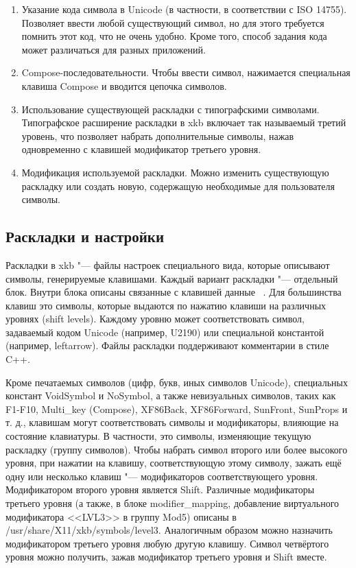 \documentclass[10pt, a5paper]{article}
\begin{document}
\begin{enumerate}
  \item Указание кода символа в Unicode (в частности, в соответствии с ISO 14755).
Позволяет ввести любой существующий символ, но для этого требуется помнить этот код, что не очень удобно. Кроме того, способ задания кода может различаться для разных приложений.
  \item Compose-последовательности.
Чтобы ввести символ, нажимается специальная клавиша Compose и вводится цепочка символов.
  \item Использование существующей раскладки с типографскими \linebreak символами.
Типографское расширение раскладки в xkb включает так называемый третий уровень, что позволяет набрать дополнительные символы, нажав одновременно с клавишей модификатор третьего уровня.
  \item Модификация используемой раскладки.
Можно изменить существующую раскладку или создать новую, содержащую необходимые для пользователя символы.
\end{enumerate}

\subsection*{Раскладки и настройки}

Раскладки в xkb "--- файлы настроек специального вида, которые описывают символы, генерируемые клавишами. Каждый вариант раскладки "--- отдельный блок. Внутри блока описаны связанные с клавишей данные ~\cite{Kononova1}. Для большинства клавиш это символы, которые выдаются по нажатию клавиши на различных уровнях (shift levels). 
Каждому уровню может соответствовать символ, задаваемый кодом Unicode (например, U2190) или специальной константой (например, leftarrow). Файлы раскладки поддерживают комментарии в стиле C++.

Кроме печатаемых символов (цифр, букв, иных символов \linebreak Unicode), специальных констант VoidSymbol и NoSymbol, а также невизуальных символов, таких как F1-F10, Multi\_key \linebreak (Compose), XF86Back, XF86Forward, SunFront, SunProps и т. д., клавишам могут соответствовать символы и модификаторы, влияющие на состояние клавиатуры. В частности, это символы, изменяющие текущую раскладку (группу символов). 
Чтобы набрать символ второго или более высокого уровня, при нажатии на клавишу, соответствующую этому символу, зажать ещё одну или несколько клавиш "--- модификаторов  соответствующего уровня. Модификатором второго уровня является Shift. Различные модификаторы третьего уровня (а также, в блоке modifier\_mapping, добавление виртуального модификатора <<LVL3>> в группу Mod5) описаны в /usr/share/X11/xkb/symbols/level3. Аналогичным образом можно назначить модификатором третьего уровня любую другую клавишу. Символ четвёртого уровня можно получить, зажав модификатор третьего уровня и Shift вместе.
\end{document}
